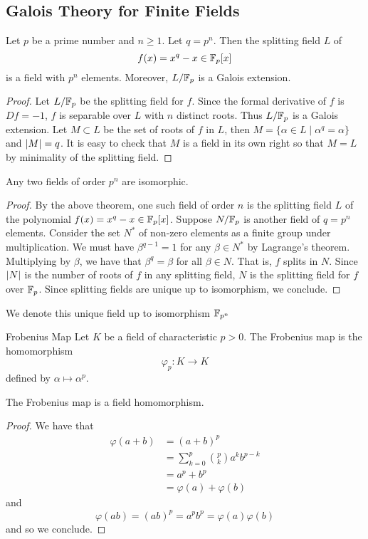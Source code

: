 \documentclass[a4paper]{article}
\begin{document}
\subsection{Galois Theory for Finite Fields}
\begin{thm}{}{} Let $p$ be a prime number and $n\geq 1$. Let $q=p^n$. Then the splitting field $L$ of $$f(x)=x^q-x\in \mathbb{F}_p[x]$$ is a field with $p^n$ elements. Moreover, $L/\mathbb{F}_p$ is a Galois extension. \tcbline
\begin{proof}
Let $L/\mathbb{F}_p$ be the splitting field for $f$. Since the formal derivative of $f$ is $Df=-1$, $f$ is separable over $L$ with $n$ distinct roots. Thus $L/\mathbb{F}_p$ is a Galois extension. Let $M\subset L$ be the set of roots of $f$ in $L$, then $M=\{\alpha\in L\;|\;\alpha^q=\alpha\}$ and $\abs{M}=q$. It is easy to check that $M$ is a field in its own right so that $M=L$ by minimality of the splitting field. 
\end{proof}
\end{thm}

\begin{prp}{}{} Any two fields of order $p^n$ are isomorphic. \tcbline
\begin{proof}
By the above theorem, one such field of order $n$ is the splitting field $L$ of the polynomial $f(x)=x^q-x\in\mathbb{F}_p[x]$. Suppose $N/\mathbb{F}_p$ is another field of $q=p^n$ elements. Consider the set $N^\ast$ of non-zero elements as a finite group under multiplication. We must have $\beta^{q-1}=1$ for any $\beta\in N^\ast$ by Lagrange's theorem. Multiplying by $\beta$, we have that $\beta^q=\beta$ for all $\beta\in N$. That is, $f$ splits in $N$. Since $\abs{N}$ is the number of roots of $f$ in any splitting field, $N$ is the splitting field for $f$ over $\mathbb{F}_p$. Since splitting fields are unique up to isomorphism, we conclude. 
\end{proof}
\end{prp}

We denote this unique field up to isomorphism $\mathbb{F}_{p^n}$

\begin{defn}{Frobenius Map}{} Let $K$ be a field of characteristic $p>0$. The Frobenius map is the homomorphism $$\varphi_p:K\to K$$ defined by $\alpha\mapsto\alpha^p$. 
\end{defn}

\begin{lmm}{}{} The Frobenius map is a field homomorphism. \tcbline
\begin{proof}
We have that 
\begin{align*}
\varphi(a+b)&=(a+b)^p\\
&=\sum_{k=0}^p\binom{p}{k}a^kb^{p-k}\\
&=a^p+b^p\\
&=\varphi(a)+\varphi(b)
\end{align*}
and $$\varphi(ab)=(ab)^p=a^pb^p=\varphi(a)\varphi(b)$$ and so we conclude. 
\end{proof}
\end{lmm}
\end{document}

